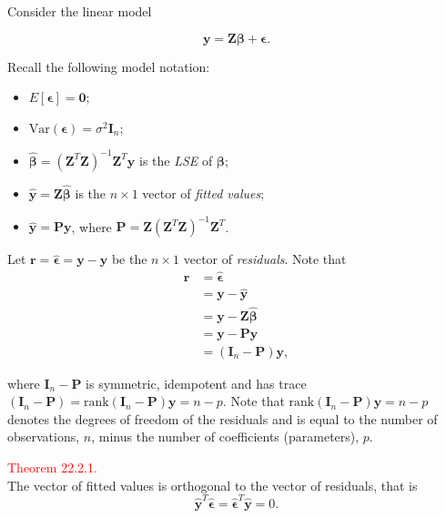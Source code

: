 \documentclass[
]{book}
\providecommand{\tightlist}{%
  \setlength{\itemsep}{0pt}\setlength{\parskip}{0pt}}
\begin{document}
Consider the linear model

\[\mathbf{y} = \mathbf{Z}\mathbf{\beta} + \mathbf{\epsilon}. \]

Recall the following model notation:

\begin{itemize}
\tightlist
\item
  \(E[\mathbf{\epsilon}] = \mathbf{0}\);\\
\item
  \(\text{Var}(\mathbf{\epsilon}) = \sigma^2\mathbf{I}_n\);\\
\item
  \(\hat{\mathbf{\beta}} = (\mathbf{Z}^T\mathbf{Z})^{-1} \mathbf{Z}^T\mathbf{y}\) is the \emph{LSE} of \(\mathbf{\beta}\);\\
\item
  \(\hat{\mathbf{y}} = \mathbf{Z}\hat{\mathbf{\beta}}\) is the \(n \times 1\) vector of \emph{fitted values};\\
\item
  \(\hat{\mathbf{y}} = \mathbf{P}\mathbf{y}\), where \(\mathbf{P} = \mathbf{Z}(\mathbf{Z}^T\mathbf{Z})^{-1} \mathbf{Z}^T\).
\end{itemize}

Let \(\mathbf{r} = \hat{\mathbf{\epsilon}} = \mathbf{y} - \hat{\mathbf{y}}\) be the \(n \times 1\) vector of \emph{residuals}. Note that\\

\begin{align*}
\mathbf{r} &= \mathbf{\hat{\epsilon}} \\ 
&= \mathbf{y}-\mathbf{\hat{y}} \\ 
&= \mathbf{y}-\mathbf{Z}\mathbf{\hat{\beta}} \\
&= \mathbf{y} - \mathbf{P} \mathbf{y} \\
&= (\mathbf{I}_n - \mathbf{P}) \mathbf{y},
\end{align*}

where \(\mathbf{I}_n - \mathbf{P}\) is symmetric, idempotent and has trace \((\mathbf{I}_n - \mathbf{P}) = \text{rank}(\mathbf{I}_n-\mathbf{P})\mathbf{y} = n-p\). Note that \(\text{rank}(\mathbf{I}_n-\mathbf{P})\mathbf{y} = n-p\) denotes the degrees of freedom of the residuals and is equal to the number of observations, \(n\), minus the number of coefficients (parameters), \(p\).

\leavevmode{}%
\textcolor{red}{Theorem 22.2.1.}\\
The vector of fitted values is orthogonal to the vector of residuals, that is
\[\hat{\mathbf{y}}^T \hat{\mathbf{\epsilon}} = \hat{\mathbf{\epsilon}}^T \hat{\mathbf{y}} = 0.\]
\end{document}

